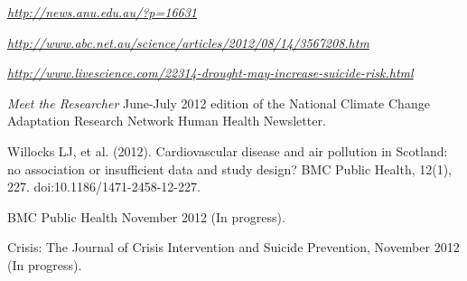 \documentclass[a4paper,11pt]{article}
\begin{document}

\medskip
\renewcommand{\labelenumi}{\textsc{g}\theenumi.}
\begin{revnumerate}

\item \emph{\href{http://news.anu.edu.au/?p=16631}{http://news.anu.edu.au/?p=16631}}

\item \emph{\href{http://www.abc.net.au/science/articles/2012/08/14/3567208.htm}{http://www.abc.net.au/science/articles/2012/08/14/3567208.htm}}

\item \emph{\href{http://www.livescience.com/22314-drought-may-increase-suicide-risk.html}{http://www.livescience.com/22314-drought-may-increase-suicide-risk.html}}

\item \emph{Meet the Researcher} June-July 2012 edition of the National Climate Change Adaptation Research Network Human Health Newsletter.
\end{revnumerate}

\medskip
\renewcommand{\labelenumi}{\textsc{h}\theenumi.}
\begin{revnumerate}

\item Willocks LJ, et al. (2012). Cardiovascular disease and air pollution in Scotland: no association or insufficient data and study design? BMC Public Health, 12(1), 227. doi:10.1186/1471-2458-12-227.

\item BMC Public Health November 2012 (In progress).

\item Crisis: The Journal of Crisis Intervention and Suicide Prevention, November 2012 (In progress).

\end{revnumerate}
\end{document}
